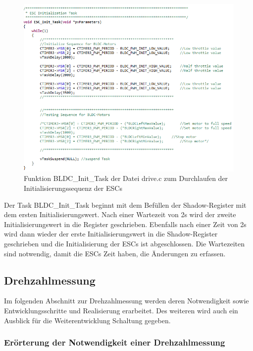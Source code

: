 \begin{figure}[H] %
\includegraphics[width=.9\textwidth]{sec4/images/DriveC2} 
\centering
\captionsetup{width=.95\textwidth}
\caption[Funktion BLDC\_Init\_Task der Datei \glqq{}drive.c\grqq{}]{Funktion BLDC\_Init\_Task der Datei \glqq{}drive.c\grqq{} zum Durchlaufen der Initialisierungssequenz der \ac{ESC}s}\centering
\label{fig:DriveC2}
\end{figure}

Der Task BLDC\_Init\_Task beginnt mit dem Befüllen der Shadow-Register mit dem ersten Initialisierungswert. Nach einer Wartezeit von 2s wird der zweite Initialisierungswert in die Register geschrieben. Ebenfalls nach einer Zeit von 2s wird dann wieder der erste Initialisierungswert in die Shadow-Register geschrieben und die Initialisierung der \ac{ESC}s ist abgeschlossen. Die Wartezeiten sind notwendig, damit die \ac{ESC}s Zeit haben, die Änderungen zu erfassen.



\newpage
\subsection{Drehzahlmessung}\label{Sec4Sub5}

Im folgenden Abschnitt zur Drehzahlmessung werden deren Notwendigkeit sowie Entwicklungsschritte und Realisierung erarbeitet. Des weiteren wird auch ein Ausblick für die Weiterentwicklung Schaltung gegeben.

\subsubsection{Erörterung der Notwendigkeit einer Drehzahlmessung}\label{Sec:NotwendigkeitDrehzahlmessung}

